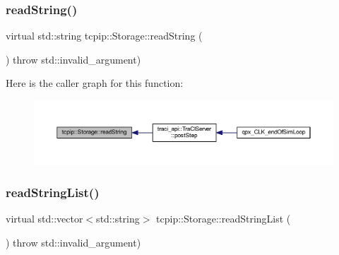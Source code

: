 \mbox{\label{classtcpip_1_1_storage_afe367b1d224d73ab06d0ab7899bcd097}} 
\subsubsection{\texorpdfstring{read\+String()}{readString()}}
{\footnotesize\ttfamily virtual std\+::string tcpip\+::\+Storage\+::read\+String (\begin{DoxyParamCaption}{ }\end{DoxyParamCaption}) throw  std\+::invalid\+\_\+argument) \hspace{0.3cm}{\ttfamily [virtual]}}

Here is the caller graph for this function\+:
\nopagebreak
\begin{figure}[H]
\begin{center}
\leavevmode
\includegraphics[width=350pt]{classtcpip_1_1_storage_afe367b1d224d73ab06d0ab7899bcd097_icgraph}
\end{center}
\end{figure}
\mbox{\label{classtcpip_1_1_storage_afc0459cbb0bf405c5d3d1730c5a98b35}} 
\subsubsection{\texorpdfstring{read\+String\+List()}{readStringList()}}
{\footnotesize\ttfamily virtual std\+::vector$<$std\+::string$>$ tcpip\+::\+Storage\+::read\+String\+List (\begin{DoxyParamCaption}{ }\end{DoxyParamCaption}) throw  std\+::invalid\+\_\+argument) \hspace{0.3cm}{\ttfamily [virtual]}}

\mbox{\label{classtcpip_1_1_storage_a46215cfa07dcabbdea932e4c69504019}} 
